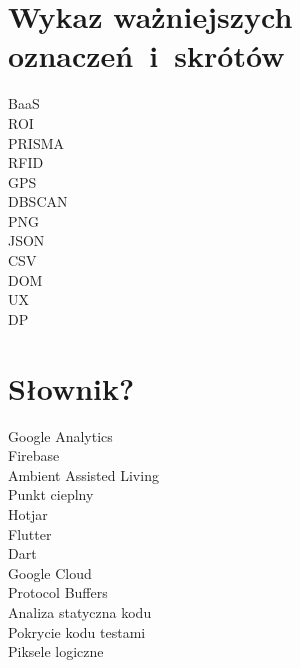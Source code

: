 \chapter*{Wykaz ważniejszych oznaczeń~i~skrótów}

\begin{description}
	\item [BaaS]
	\item [ROI]
	\item [PRISMA]
	\item [RFID]
	\item [GPS]
	\item [DBSCAN]
	\item [PNG]
	\item [JSON]
	\item [CSV]
	\item [DOM]
	\item [UX]
	\item [DP]
\end{description}

\chapter*{Słownik?}

\begin{description}
	\item [Google Analytics]
	\item [Firebase]
	\item [Ambient Assisted Living] 
	\item [Punkt cieplny]
	\item [Hotjar]
	\item [Flutter]
	\item [Dart]
	\item [Google Cloud]
	\item [Protocol Buffers]
	\item [Analiza statyczna kodu]
	\item [Pokrycie kodu testami]
	\item [Piksele logiczne]
\end{description}
